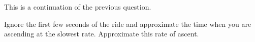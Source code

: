\documentclass{ximera}
\begin{document}
\begin{question} \label{Q:3rerfggg}
This is a continuation of the previous question.

Ignore the first few seconds of the ride and approximate the time when you are ascending at the slowest rate. Approximate this rate of ascent. 

\end{question}
\end{document}
